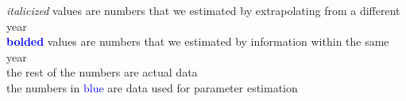 \documentclass[12pt]{article}
\begin{document}
\begin{sidewaystable}
\textit{italicized} values are numbers that we estimated by extrapolating from a different year \\
 \textbf{\textcolor{blue}{bolded}} values are numbers that we estimated by information within the same year \\
 the rest of the numbers are actual data \\
 the numbers in \textcolor{blue}{blue} are data used for parameter estimation
\label{tab:template}
\end{sidewaystable} 

 
\pagebreak

\end{document}
